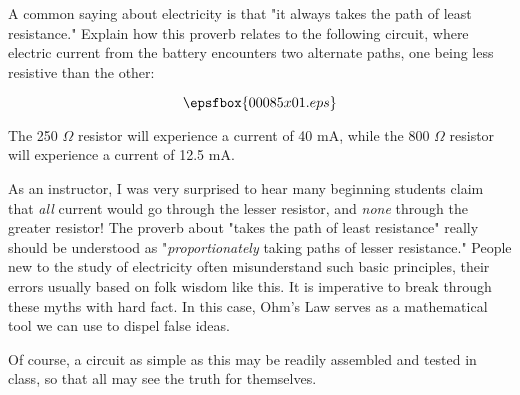 

A common saying about electricity is that "it always takes the path of least resistance."  Explain how this proverb relates to the following circuit, where electric current from the battery encounters two alternate paths, one being less resistive than the other:

$$\epsfbox{00085x01.eps}$$







The 250 $\Omega$ resistor will experience a current of 40 mA, while the 800 $\Omega$ resistor will experience a current of 12.5 mA.







As an instructor, I was very surprised to hear many beginning students claim that {\it all} current would go through the lesser resistor, and {\it none} through the greater resistor!  The proverb about "takes the path of least resistance" really should be understood as "{\it proportionately} taking paths of lesser resistance."  People new to the study of electricity often misunderstand such basic principles, their errors usually based on folk wisdom like this.  It is imperative to break through these myths with hard fact.  In this case, Ohm's Law serves as a mathematical tool we can use to dispel false ideas.

Of course, a circuit as simple as this may be readily assembled and tested in class, so that all may see the truth for themselves.





